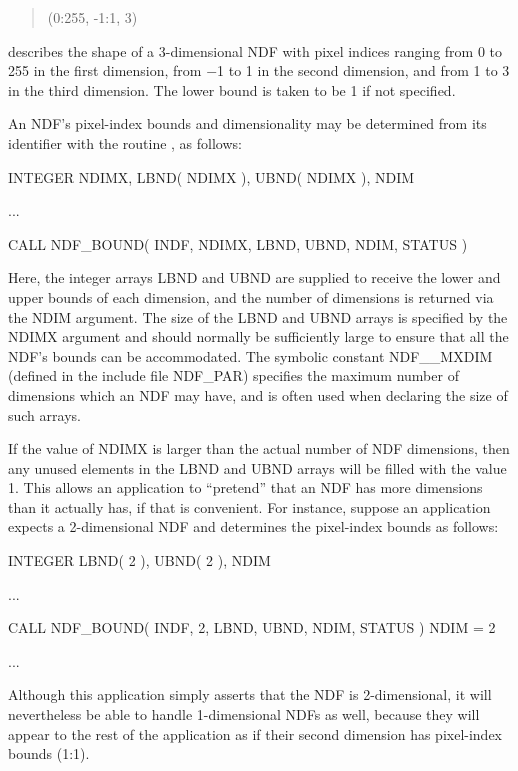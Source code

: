 \documentclass[twoside,11pt,nolof]{starlink}
\begin{document}
\small
\begin{quote}
\begin{center}
(0:255, -1:1, 3)
\end{center}
\end{quote}
\normalsize

describes the shape of a 3-dimensional NDF with pixel indices ranging from 0
to 255 in the first dimension, from $-$1 to 1 in the second dimension, and
from 1 to 3 in the third dimension.
The lower bound is taken to be 1 if not specified.

An NDF's pixel-index bounds and dimensionality may be determined from its
identifier with the routine , as follows:

\small
\begin{terminalv}
      INTEGER NDIMX, LBND( NDIMX ), UBND( NDIMX ), NDIM

      ...

      CALL NDF_BOUND( INDF, NDIMX, LBND, UBND, NDIM, STATUS )
\end{terminalv}
\normalsize

Here, the integer arrays LBND and UBND are supplied to receive the lower and
upper bounds of each dimension, and the number of dimensions is returned via the
NDIM argument.
The size of the LBND and UBND arrays is specified by the NDIMX argument and
should normally be sufficiently large to ensure that all the NDF's bounds can be
accommodated.
The symbolic constant NDF\_\_MXDIM (defined in the include file NDF\_PAR)
specifies the maximum number of dimensions which an NDF may have, and is
often used when declaring the size of such arrays.

If the value of NDIMX is larger than the actual number of NDF dimensions,
then any unused elements in the LBND and UBND arrays will be filled with the
value 1.
This allows an application to ``pretend'' that an NDF has more dimensions than
it actually has, if that is convenient.
For instance, suppose an application expects a 2-dimensional NDF and determines
the pixel-index bounds as follows:

\small
\begin{terminalv}
      INTEGER LBND( 2 ), UBND( 2 ), NDIM

      ...

      CALL NDF_BOUND( INDF, 2, LBND, UBND, NDIM, STATUS )
      NDIM = 2

      ...
\end{terminalv}
\normalsize

Although this application simply asserts that the NDF is 2-dimensional, it
will nevertheless be able to handle 1-dimensional NDFs as well, because they
will appear to the rest of the application as if their second dimension has
pixel-index bounds (1:1).
\end{document}
